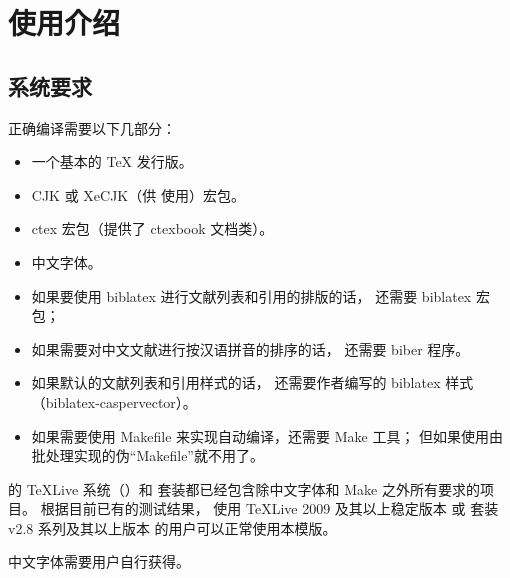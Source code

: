 %

\chapter{使用介绍}
	\section{系统要求}\label{sec:req}

	正确编译需要以下几部分：
	\begin{itemize}
		\item 一个基本的 \TeX{} 发行版。
		\item CJK 或 XeCJK（供  使用）宏包。
		\item ctex 宏包\supercite{ctex,ctex-faq}（提供了 ctexbook 文档类）。
		\item 中文字体。
		\item 如果要使用 biblatex 进行文献列表和引用的排版的话，
			还需要 biblatex 宏包\supercite{biblatex}；
		\item 如果需要对中文文献进行按汉语拼音的排序的话，
			还需要 biber 程序\supercite{biber}。
		\item 如果默认的文献列表和引用样式的话，
			还需要作者编写的 biblatex 样式
			（biblatex-caspervector）\supercite{biblatex-caspervector}。
		\item 如果需要使用 Makefile 来实现自动编译，还需要 Make 工具；
			但如果使用由批处理实现的伪“Makefile”就不用了。
	\end{itemize}

	的 \TeX{}Live 系统（）和 \CTeX{} 套装都已经包含除中文字体和 Make 之外所有要求的项目。%
	根据目前已有的测试结果，
	使用 \TeX{}Live 2009 及其以上稳定版本%
	或 \CTeX{} 套装 v2.8 系列及其以上版本
	的用户可以正常使用本模版。

	中文字体需要用户自行获得。

